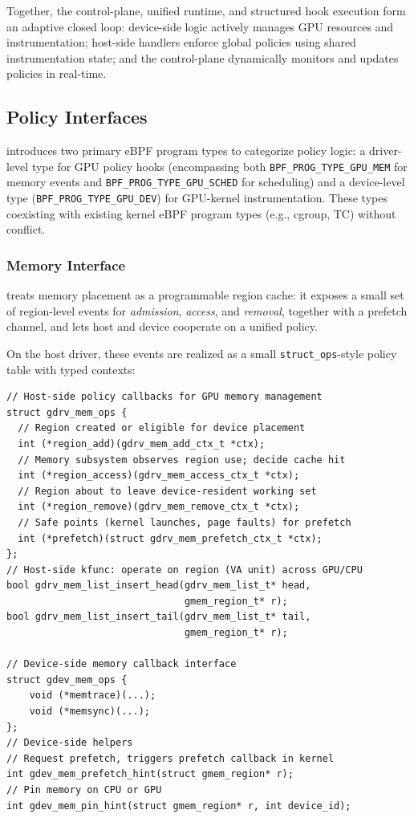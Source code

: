 Together, the control-plane, unified runtime, and structured hook execution form an adaptive closed loop: device-side logic actively manages GPU resources and instrumentation; host-side handlers enforce global policies using shared instrumentation state; and the control-plane dynamically monitors and updates policies in real-time.

\subsection{Policy Interfaces}
\label{sec:design-interfaces}

\sys introduces two primary eBPF program types to categorize policy logic:
a driver-level type for GPU policy hooks (encompassing both \texttt{BPF\_PROG\_TYPE\_GPU\_MEM} for memory events and \texttt{BPF\_PROG\_TYPE\_GPU\_SCHED} for scheduling) and a device-level type (\texttt{BPF\_PROG\_TYPE\_GPU\_DEV}) for GPU-kernel instrumentation. These types coexisting with existing kernel eBPF program types (e.g., cgroup, TC) without conflict.

\subsubsection{Memory Interface}
\label{sec:design-mem}

\sys treats memory placement as a programmable region
cache: it exposes a small set of region-level events for \emph{admission},
\emph{access}, and \emph{removal}, together with a prefetch channel, and lets host
and device cooperate on a unified policy.

On the host driver, these events are realized as a small \texttt{struct\_ops}-style policy
table with typed contexts:

\begin{verbatim}
// Host-side policy callbacks for GPU memory management
struct gdrv_mem_ops {
  // Region created or eligible for device placement
  int (*region_add)(gdrv_mem_add_ctx_t *ctx);
  // Memory subsystem observes region use; decide cache hit
  int (*region_access)(gdrv_mem_access_ctx_t *ctx);
  // Region about to leave device-resident working set
  int (*region_remove)(gdrv_mem_remove_ctx_t *ctx);
  // Safe points (kernel launches, page faults) for prefetch
  int (*prefetch)(struct gdrv_mem_prefetch_ctx_t *ctx);
};
// Host-side kfunc: operate on region (VA unit) across GPU/CPU
bool gdrv_mem_list_insert_head(gdrv_mem_list_t* head, 
                               gmem_region_t* r);
bool gdrv_mem_list_insert_tail(gdrv_mem_list_t* tail, 
                               gmem_region_t* r);

// Device-side memory callback interface
struct gdev_mem_ops {
    void (*memtrace)(...);
    void (*memsync)(...);
};
// Device-side helpers
// Request prefetch, triggers prefetch callback in kernel
int gdev_mem_prefetch_hint(struct gmem_region* r);
// Pin memory on CPU or GPU
int gdev_mem_pin_hint(struct gmem_region* r, int device_id);
\end{verbatim}

